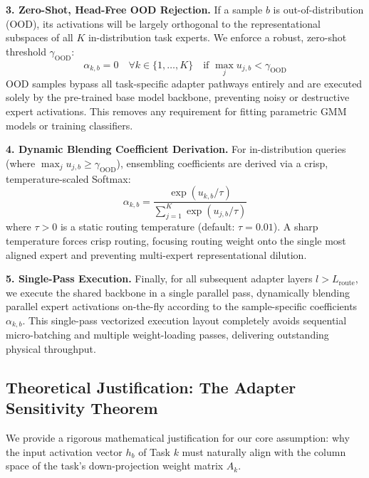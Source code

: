 \textbf{3. Zero-Shot, Head-Free OOD Rejection.} If a sample $b$ is out-of-distribution (OOD), its activations will be largely orthogonal to the representational subspaces of all $K$ in-distribution task experts. We enforce a robust, zero-shot threshold $\gamma_{\text{OOD}}$:
\begin{equation}
    \alpha_{k, b} = 0 \quad \forall k \in \{1, \dots, K\} \quad \text{if } \max_{j} u_{j, b} < \gamma_{\text{OOD}}
\end{equation}
OOD samples bypass all task-specific adapter pathways entirely and are executed solely by the pre-trained base model backbone, preventing noisy or destructive expert activations. This removes any requirement for fitting parametric GMM models or training classifiers.

\textbf{4. Dynamic Blending Coefficient Derivation.} For in-distribution queries (where $\max_j u_{j, b} \ge \gamma_{\text{OOD}}$), ensembling coefficients are derived via a crisp, temperature-scaled Softmax:
\begin{equation}
    \alpha_{k, b} = \frac{\exp(u_{k, b} / \tau)}{\sum_{j=1}^K \exp(u_{j, b} / \tau)}
\end{equation}
where $\tau > 0$ is a static routing temperature (default: $\tau = 0.01$). A sharp temperature forces crisp routing, focusing routing weight onto the single most aligned expert and preventing multi-expert representational dilution.

\textbf{5. Single-Pass Execution.} Finally, for all subsequent adapter layers $l > L_{\text{route}}$, we execute the shared backbone in a single parallel pass, dynamically blending parallel expert activations on-the-fly according to the sample-specific coefficients $\alpha_{k, b}$. This single-pass vectorized execution layout completely avoids sequential micro-batching and multiple weight-loading passes, delivering outstanding physical throughput.

\subsection{Theoretical Justification: The Adapter Sensitivity Theorem}
\label{subsec:method_theory}

We provide a rigorous mathematical justification for our core assumption: why the input activation vector $h_b$ of Task $k$ must naturally align with the column space of the task's down-projection weight matrix $A_k$.

